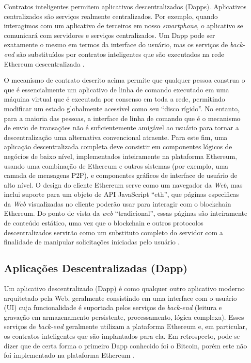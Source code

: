 Contratos inteligentes permitem aplicativos descentralizados (Dapps). Aplicativos centralizados são serviços realmente centralizados. Por exemplo, quando interagimos com um aplicativo de terceiros em nosso \textit{smartphone}, o aplicativo se comunicará com servidores e serviços centralizados. Um Dapp pode ser exatamente o mesmo em termos da interface do usuário, mas os serviços de \textit{back-end} são substituídos por contratos inteligentes que são executados na rede Ethereum descentralizada \cite{blockchain_pratical_guide}.

O mecanismo de contrato descrito acima permite que qualquer pessoa construa o que é essencialmente um aplicativo de linha de comando executado em uma máquina virtual que é executada por consenso em toda a rede, permitindo modificar um estado globalmente acessível como seu “disco rígido”.
No entanto, para a maioria das pessoas, a interface de linha de comando que é o mecanismo de envio de transações não é suficientemente amigável ao usuário para tornar a descentralização uma alternativa convencional atraente. Para este fim, uma aplicação descentralizada completa deve consistir em
componentes lógicos de negócios de baixo nível, implementados inteiramente na plataforma Ethereum, usando uma combinação de Ethereum e outros sistemas (por exemplo, uma camada de mensagens P2P), e componentes gráficos de interface de usuário de alto nível. O design do cliente Ethereum serve como um navegador da \textit{Web}, mas inclui suporte para um objeto de API JavaScript “eth”, que páginas especificas da \textit{Web} visualizadas no cliente poderão usar para interagir com o blockchain Ethereum. Do ponto de vista da \textit{web} “tradicional”, essas páginas são inteiramente de conteúdo estático, uma vez que o blockchain e outros protocolos descentralizados servirão como um substituto completo do servidor com a finalidade de manipular solicitações iniciadas pelo usuário \cite{ethereum_white_paper}.


\subsection{Aplicações Descentralizadas (Dapp)}

Um aplicativo descentralizado (Dapp) é como qualquer outro aplicativo moderno arquitetado pela Web, geralmente consistindo em uma interface com o usuário (UI) cuja funcionalidade é suportada pelos serviços de \textit{back-end} (leitura e gravação em armazenamento persistente, processamento, lógica complexa). Esses serviços de \textit{back-end} geralmente utilizam a plataforma Ethereum e, em particular, os contratos inteligentes que são implantados para ela. Em retrospecto, pode-se dizer que de certa forma o primeiro Dapp conhecido foi o Bitcoin, porém este não foi implementado na plataforma Ethereum \cite{blockchain_pratical_guide}.

